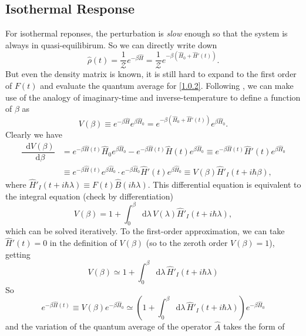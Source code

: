 \documentclass[10pt,nofootinbib,letterpaper]{revtex4}
\newcommand*\dd{\mathop{}\!\mathrm{d}}
\def\Z{\mathcal{Z}}
\begin{document}
	\subsection{Isothermal Response}
		For isothermal reponses, the perturbation is \emph{slow} enough so that the system is always in quasi-equilibirum. So we can directly write down
		\begin{equation}\label{1.1.1}
			\hat\rho(t)=\dfrac{1}{\Z}e^{-\beta\hat H}=\dfrac{1}{\Z}e^{-\beta(\hat H_0+\hat H'(t))}.
		\end{equation}
		But even the density matrix is known, it is still hard to expand to the first order of $F(t)$ and evaluate the quantum average for \eqref{1.0.2}. Following \cite{levy2000magnetism}, we can make use of the analogy of imaginary-time and inverse-temperature to define a function of $\beta$ as
		\begin{equation*}
			V(\beta)\equiv e^{-\beta\hat H}e^{\beta\hat H_0}= e^{-\beta(\hat H_0+\hat H'(t))}e^{\beta\hat H_0}.
		\end{equation*}
		Clearly we have
		\begin{align*}
			\dfrac{\dd V(\beta)}{\dd\beta}&=e^{-\beta\hat H(t)}\hat H_0 e^{\beta\hat H_0}-e^{-\beta\hat H(t)}\hat H(t)e^{\beta\hat H_0}\equiv e^{-\beta\hat H(t)}\hat H'(t)e^{\beta\hat H_0}\\
			&\equiv e^{-\beta\hat H(t)}e^{\beta\hat H_0}\cdot e^{-\beta\hat H_0}\hat H'(t)e^{\beta\hat H_0}\equiv V(\beta)\hat H'_I(t+i\hbar\beta),
		\end{align*}
		where $\hat H'_I(t+i\hbar\lambda)\equiv F(t)\hat B(i\hbar\lambda)$. This differential equation is equivalent to the integral equation (check by differentiation)
		\begin{equation}\label{1.1.2}
			V(\beta)=1+\int_0^\beta\dd\lambda\,V(\lambda)\hat H'_I(t+i\hbar\lambda),
		\end{equation}
		which can be solved iteratively. To the first-order approximation, we can take $\hat H'(t)=0$ in the definition of $V(\beta)$ (so to the zeroth order $V(\beta)=1$), getting
		\begin{equation}\label{1.1.3}
			V(\beta)\simeq1+\int_0^\beta\dd\lambda\,\hat H'_I(t+i\hbar\lambda)
		\end{equation}
		So
		\begin{equation}\label{1.1.4}
			e^{-\beta\hat H(t)}\equiv V(\beta)e^{-\beta\hat H_0}\simeq \left(1+\int_0^\beta\dd\lambda\,\hat H'_I(t+i\hbar\lambda)\right)e^{-\beta\hat H_0} 
		\end{equation}
		and the variation of the quantum average of the operator $\hat A$ takes the form of
\end{document}
